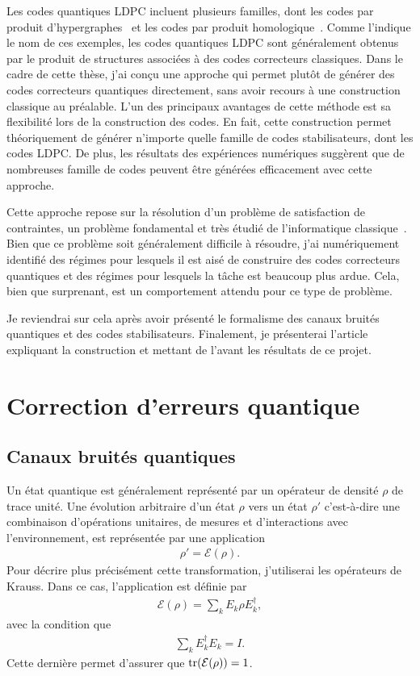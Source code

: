 Les codes quantiques LDPC incluent plusieurs familles,
dont les codes par produit d'hypergraphes~\cite{tillich_quantum_2014}
et les codes par produit homologique~\cite{bravyi_homological_2014}.
Comme l'indique le nom de ces exemples,
les codes quantiques LDPC sont généralement obtenus par le produit 
de structures associées à des codes correcteurs classiques.
Dans le cadre de cette thèse,
j'ai conçu une approche qui permet plutôt de générer des codes correcteurs quantiques
directement,
sans avoir recours à une construction classique au préalable.
L'un des principaux avantages de cette méthode est sa flexibilité 
lors de la construction des codes.
En fait,
cette construction permet théoriquement de générer n'importe quelle famille de codes stabilisateurs,
dont les codes LDPC.
De plus,
les résultats des expériences numériques suggèrent que de nombreuses famille de codes peuvent 
être générées efficacement avec cette approche.

Cette approche repose sur la résolution d'un problème de satisfaction de contraintes,
un problème fondamental et très étudié de l'informatique classique~\cite{lecoutre_constraint_2009}.
Bien que ce problème soit généralement difficile à résoudre,
j'ai numériquement identifié des régimes pour lesquels il est aisé de
construire des codes correcteurs quantiques
et des régimes pour lesquels la tâche est beaucoup plus ardue.
Cela, bien que surprenant, est un comportement attendu pour ce type de problème.

Je reviendrai sur cela après avoir présenté le formalisme des canaux bruités quantiques 
et des codes stabilisateurs.
Finalement,
je présenterai l'article expliquant la construction et 
mettant de l'avant les résultats de ce projet.

\section{Correction d'erreurs quantique}

\subsection{Canaux bruités quantiques}

Un état quantique est généralement représenté par un opérateur de densité $\rho$
de trace unité.
Une évolution arbitraire d'un état $\rho$ vers un état $\rho'$
c'est-à-dire une combinaison d'opérations unitaires,
de mesures et d'interactions avec l'environnement, 
est représentée par une application
\begin{align}
  \rho' = \mathcal{E}(\rho).
\end{align}
Pour décrire plus précisément cette transformation,
j'utiliserai les opérateurs de Krauss.
Dans ce cas,
l'application est définie par
\begin{align}
  \mathcal{E}(\rho) = \sum_{k} E_k \rho E_k^\dag,
\end{align}
avec la condition que 
\begin{align}
  \sum_k E_k^\dag E_k = I.
\end{align}
Cette dernière permet d'assurer que $\tr(\mathcal{E}(\rho)) = 1$.

